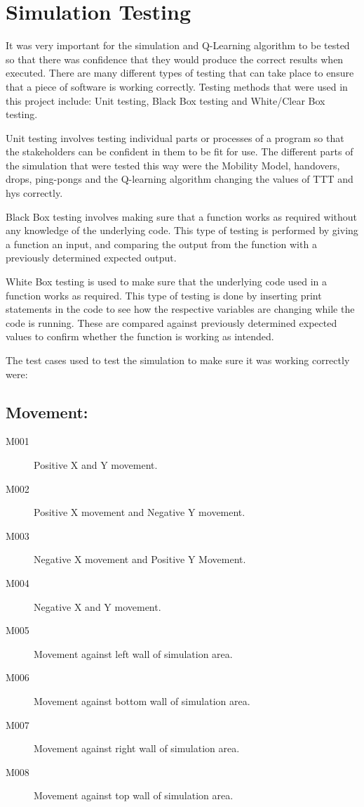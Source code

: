 \section{Simulation Testing}
It was very important for the simulation and Q-Learning algorithm to be tested so that there was confidence that they would produce the correct results when executed. There are many different types of testing that can take place to ensure that a piece of software is working correctly. Testing methods that were used in this project include: Unit testing, Black Box testing and White/Clear Box testing.

Unit testing involves testing individual parts or processes of a program so that the stakeholders can be confident in them to be fit for use. The different parts of the simulation that were tested this way were the Mobility Model, handovers, drops, ping-pongs and the Q-learning algorithm changing the values of TTT and hys correctly.

Black Box testing involves making sure that a function works as required without any knowledge of the underlying code. This type of testing is performed by giving a function an input, and comparing the output from the function with a previously determined expected output.

White Box testing is used to make sure that the underlying code used in a function works as required. This type of testing is done by inserting print statements in the code to see how the respective variables are changing while the code is running. These are compared against previously determined expected values to confirm whether the function is working as intended.

The test cases used to test the simulation to make sure it was working correctly were: 
\subsection*{Movement:}
\begin{description}
\item[M001]	Positive X and Y movement.
\item[M002]	Positive X movement and Negative Y movement.
\item[M003]	Negative X movement and Positive Y Movement.
\item[M004]	Negative X and Y movement.
\item[M005]	Movement against left wall of simulation area.
\item[M006]	Movement against bottom wall of simulation area.
\item[M007]	Movement against right wall of simulation area.
\item[M008]	Movement against top wall of simulation area.
\end{description}

